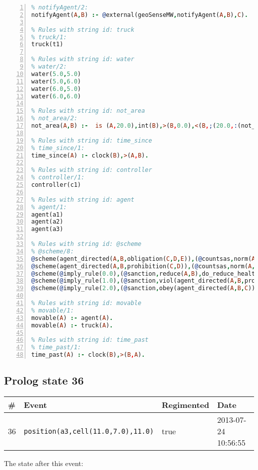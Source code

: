 \documentclass[11pt]{article}\usepackage[utf8]{inputenc}\usepackage{geometry}
\begin{document}
\begin{lstlisting}[language=Prolog, numbers=left]
% Rules with string id: notifyAgent
% notifyAgent/2:
notifyAgent(A,B) :- @external(geoSenseMW,notifyAgent(A,B),C).

% Rules with string id: truck
% truck/1:
truck(t1)

% Rules with string id: water
% water/2:
water(5.0,5.0)
water(5.0,6.0)
water(6.0,5.0)
water(6.0,6.0)

% Rules with string id: not_area
% not_area/2:
not_area(A,B) :-  is (A,20.0),int(B),>(B,0.0),<(B,;(20.0,:(not_area(A,B), is (-(B),20.0)))),int(A),>(A,0.0),<(A,;(20.0,:(area(A,B),-(int(A))))),int(B),>(A,0.0),>(B,0.0),<(A,21.0),<(B,21.0).

% Rules with string id: time_since
% time_since/1:
time_since(A) :- clock(B),>(A,B).

% Rules with string id: controller
% controller/1:
controller(c1)

% Rules with string id: agent
% agent/1:
agent(a1)
agent(a2)
agent(a3)

% Rules with string id: @scheme
% @scheme/8:
@scheme(agent_directed(A,B,obligation(C,D,E)),(@countsas,norm(A,B,F,obligation(C,D,E)),F),false,(listTrue(C)),(time_past(D)),false,[plus(viol(agent_directed(A,B,obligation(C,D,E))))|[]],[plus(obey(agent_directed(A,B,obligation(C,D,E))))|[]])
@scheme(agent_directed(A,B,prohibition(C,D)),(@countsas,norm(A,B,E,prohibition(C,D)),E),(listTrue(C)),false,(false),false,[plus(viol(agent_directed(A,B,prohibition(C,D))))|[]],[plus(obey(agent_directed(A,B,prohibition(C,D))))|[]])
@scheme(@imply_rule(0.0),(@sanction,reduce(A,B),do_reduce_health(A,B),notifyAgent(A,changed(status))),true,false,false,false,[min(reduce(A,B))|[]],[])
@scheme(@imply_rule(1.0),(@sanction,viol(agent_directed(A,B,prohibition(C,D))),do_sanction(D)),true,false,false,false,[min(viol(agent_directed(A,B,prohibition(C,D))))|[]],[])
@scheme(@imply_rule(2.0),(@sanction,obey(agent_directed(A,B,C))),true,false,false,false,[min(obey(agent_directed(A,B,C)))|[]],[])

% Rules with string id: movable
% movable/1:
movable(A) :- agent(A).
movable(A) :- truck(A).

% Rules with string id: time_past
% time_past/1:
time_past(A) :- clock(B),>(B,A).

\end{lstlisting}
\clearpage 
\subsection{Prolog state 36}
\begin{table}[ht]
\centering 
\begin{tabular}{l l l l} 
\textbf{\#} & \textbf{Event} & \textbf{Regimented} & \textbf{Date} \\ [0.5ex] 
\hline
36&\texttt{position(a3,cell(11.0,7.0),11.0)}&true&2013-07-24 10:56:55\\ [1ex] \hline\end{tabular}
\end{table}
The state after this event:
\end{document}
